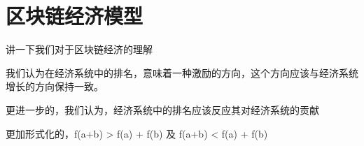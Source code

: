 \section{区块链经济模型}
讲一下我们对于区块链经济的理解

我们认为在经济系统中的排名，意味着一种激励的方向，这个方向应该与经济系统增长的方向保持一致。

更进一步的，我们认为，经济系统中的排名应该反应其对经济系统的贡献

更加形式化的，f(a+b) > f(a) + f(b) 及 f(a+b) < f(a) + f(b)
